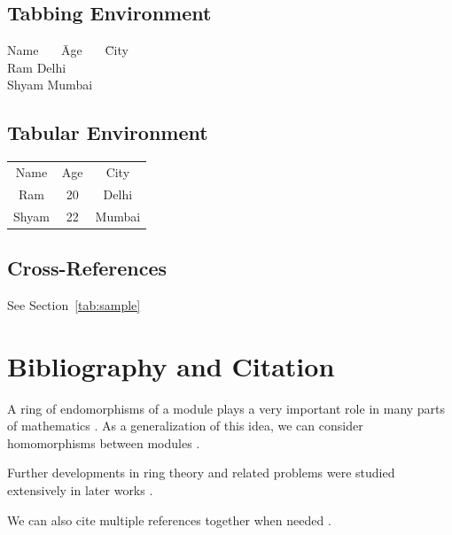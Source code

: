 \documentclass{article}
\begin{document}
\subsection{Tabbing Environment}
\begin{tabbing}
    Name~~~ \= Age~~~ \= City \\
    Ram  \> Delhi \\
    Shyam  \> Mumbai \\
\end{tabbing}

\subsection{Tabular Environment}
\begin{tabular}{c|c|c}
    Name & Age & City \\
    Ram & 20 & Delhi \\
    Shyam & 22 & Mumbai
\end{tabular}

\subsection{Cross-References}
\label{sec:intro}
See Section~\ref{tab:sample}
\newpage

\section{Bibliography and Citation}

A ring of endomorphisms of a module plays a very important role in many parts of mathematics \cite{nobusawa1964generalization}. As a generalization of this idea, we can consider homomorphisms between modules \cite{nobusawa1964generalization}. 

Further developments in ring theory and related problems were studied extensively in later works \cite{kaplansky1970problems}.

We can also cite multiple references together when needed \cite{nobusawa1964generalization, kaplansky1970problems}.



\end{document}
